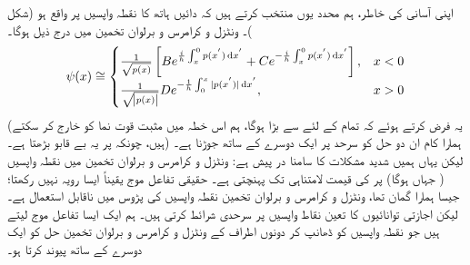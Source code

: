 اپنی آسانی کی خاطر، ہم محدد  یوں  منتخب  کرتے  ہیں کہ دائیں ہاتھ کا نقطہ واپسیں  پر واقع ہو (شکل )۔ ونٹزل و کرامرس و برلوان  تخمین میں درج ذیل ہوگا۔
\begin{align}\label{مساوات_وقب_تخمین}
	\psi (x) \cong
	\begin{cases}
		\frac{1}{\sqrt{p(x)}}\left[B e^{\frac{i}{h} \int^{0}_{x} p(x^{'}) \dif x^{'}} + C e^{- \frac{i}{h} \int^{0}_{x} p(x^{'}) \dif x^{'}}\right] ,& x < 0 \\
		\frac{1}{\sqrt{\abs{p(x)}}} D e^{- \frac{1}{h} \int^{x}_{0}|p(x^{'})| \dif x^{'}},& x> 0 
	\end{cases}
\end{align}
(یہ فرض کرتے ہوئے  کہ تمام  کے لئے   سے  بڑا ہوگا،  ہم اس خطہ میں مثبت قوت نما کو خارج کر سکتے ہیں،  چونکہ  پر  یہ بے قابو بڑھتا ہے۔)  ہمارا کام ان دو حل  کو سرحد پر ایک دوسرے کے ساتھ جوڑنا ہے۔ لیکن  یہاں ہمیں شدید مشکلات کا سامنا در پیش ہے: ونٹزل و کرامرس و برلوان  تخمین میں  نقطہ واپسیں ( جہاں  ہوگا)  پر   کی قیمت لامتناہی تک پہنچتی ہے۔ حقیقی تفاعل موج یقیناً ایسا رویہ نہیں رکھتا؛ جیسا ہمارا گمان تھا،   ونٹزل و کرامرس و برلوان  تخمین نقطہ واپسیں کی پڑوس میں ناقابل استعمال ہے۔ لیکن اجازتی توانائیوں کا تعین  نقاط واپسیں پر سرحدی شرائط  کرتی ہیں۔ ہم ایک ایسا   تفاعل موج لیتے ہیں جو نقطہ واپسیں کو ڈھانپ کر دونوں اطراف کے ونٹزل و کرامرس و برلوان  تخمین حل کو ایک دوسرے کے ساتھ پیوند کرتا ہو۔

